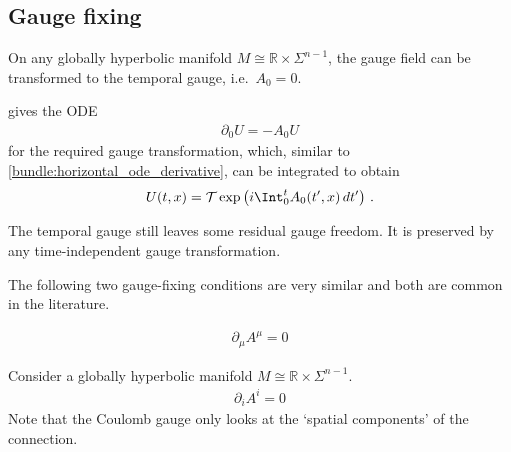 \subsection{Gauge fixing}


    \begin{example}
        On any globally hyperbolic manifold $M\cong\mathbb{R}\times\Sigma^{n-1}$, the gauge field can be transformed to the temporal gauge, i.e.~$A_0=0$.

         gives the ODE
        \begin{gather}
            \partial_0U = -A_0U
        \end{gather}
        for the required gauge transformation, which, similar to \eqref{bundle:horizontal_ode_derivative}, can be integrated to obtain
        \begin{gather}
            U(t,x) = \mathcal{T}\exp\left(i\Int_0^tA_0(t',x)\,dt'\right)\,.
        \end{gather}
    \end{example}
    \begin{property}
        The temporal gauge still leaves some residual gauge freedom. It is preserved by any time-independent gauge transformation.
    \end{property}

    The following two gauge-fixing conditions are very similar and both are common in the literature.
    \begin{example}
        \begin{gather}
            \partial_\mu A^\mu = 0
        \end{gather}
    \end{example}
    \begin{example}
        Consider a globally hyperbolic manifold $M\cong\mathbb{R}\times\Sigma^{n-1}$.
        \begin{gather}
            \partial_iA^i= 0
        \end{gather}
        Note that the Coulomb gauge only looks at the `spatial components' of the connection.
    \end{example}

